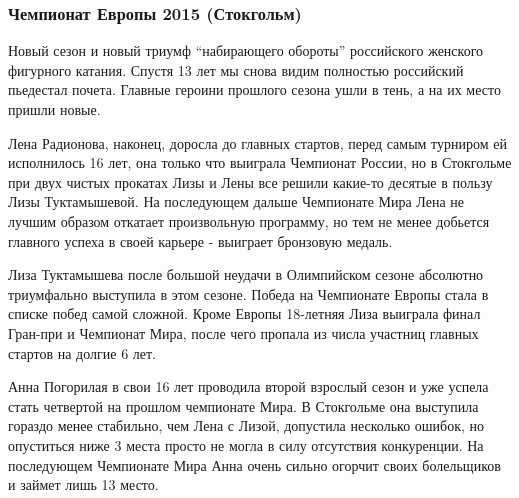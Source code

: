  
 
 
 
 
\subsubsection{Чемпионат Европы 2015 (Стокгольм)}
\label{sec:04_01_2022.yz.figurka_ot_maksima_jagudina.1.chempionaty_evropy.5.stokholm_2015}

Новый сезон и новый триумф \enquote{набирающего обороты} российского женского фигурного
катания. Спустя 13 лет мы снова видим полностью российский пьедестал почета.
Главные героини прошлого сезона ушли в тень, а на их место пришли новые. 


Лена Радионова, наконец, доросла до главных стартов, перед самым турниром ей
исполнилось 16 лет, она только что выиграла Чемпионат России, но в Стокгольме
при двух чистых прокатах Лизы и Лены все решили какие-то десятые в пользу Лизы
Туктамышевой. На последующем дальше Чемпионате Мира Лена не лучшим образом
откатает произвольную программу, но тем не менее добьется главного успеха в
своей карьере - выиграет бронзовую медаль.


Лиза Туктамышева после большой неудачи в Олимпийском сезоне абсолютно
триумфально выступила в этом сезоне. Победа на Чемпионате Европы стала в списке
побед самой сложной. Кроме Европы 18-летняя Лиза выиграла финал Гран-при и
Чемпионат Мира, после чего пропала из числа участниц главных стартов на долгие
6 лет.

Анна Погорилая в свои 16 лет проводила второй взрослый сезон и уже успела стать
четвертой на прошлом чемпионате Мира. В Стокгольме она выступила гораздо менее
стабильно, чем Лена с Лизой, допустила несколько ошибок, но опуститься ниже 3
места просто не могла в силу отсутствия конкуренции. На последующем Чемпионате
Мира Анна очень сильно огорчит своих болельщиков и займет лишь 13 место.
